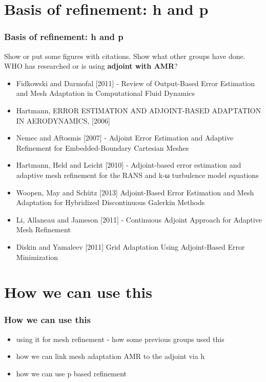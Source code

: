 \documentclass{beamer}
\begin{document}
\section[Refinement]{Basis of refinement: h and p}
\begin{frame}[allowframebreaks]
\frametitle{Basis of refinement: h and p}
Show or put some figures with citations. Show what other groups have done. WHO has researched or is using \textbf{adjoint with AMR}?
\begin{itemize}
\item Fidkowski and Darmofal [2011] - Review of Output-Based Error Estimation and Mesh Adaptation in Computational Fluid Dynamics
\item Hartmann, ERROR ESTIMATION AND ADJOINT-BASED ADAPTATION IN AERODYNAMICS, [2006]
\item Nemec and Aftosmis [2007] - Adjoint Error Estimation and Adaptive Refinement for Embedded-Boundary Cartesian Meshes
\item Hartmann, Held and Leicht [2010] - Adjoint-based error estimation and adaptive mesh refinement for the RANS and k-ω turbulence model equations
\item Woopen, May and Sch{\"u}tz [2013] Adjoint-Based Error Estimation and Mesh Adaptation for Hybridized Discontinuous Galerkin Methods
\item Li, Allaneau and Jameson [2011] - Continuous Adjoint Approach for Adaptive Mesh Refinement
\item Diskin and Yamaleev [2011] Grid Adaptation Using Adjoint-Based Error Minimization
\end{itemize}
\end{frame}


\section[Usage]{How we can use this}

\begin{frame}[allowframebreaks]
\frametitle{How we can use this}
\begin{itemize}
\item using it for mesh refinement - how some previous groups used this
\item how we can link mesh adaptation AMR to the adjoint via h
\item how we can use p based refinement
\end{itemize}
\end{frame}
\end{document}
